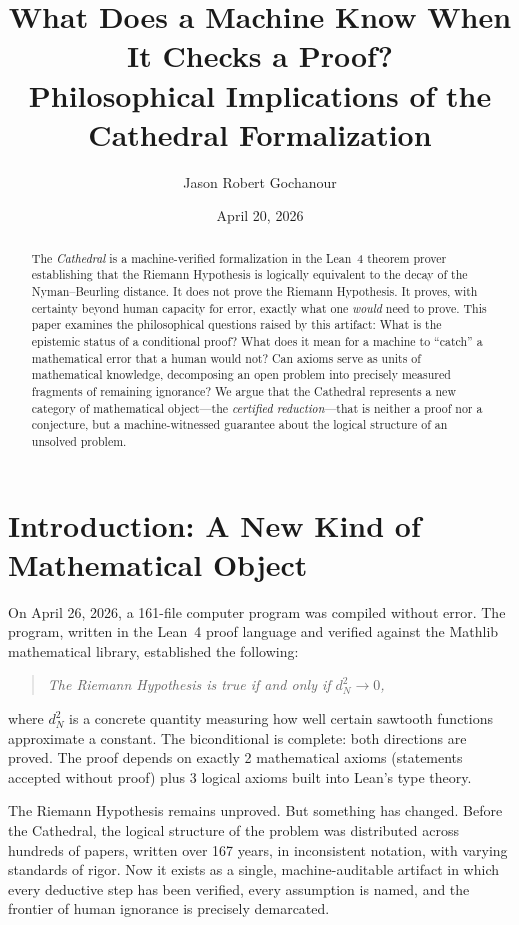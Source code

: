 \documentclass[11pt,a4paper]{article}
\title{%
  What Does a Machine Know When It Checks a Proof?\\[0.3cm]
  {\large Philosophical Implications of the Cathedral Formalization}%
}
\author{
  Jason Robert Gochanour
}
\date{April 20, 2026}
\begin{document}
\maketitle

\begin{abstract}
The \emph{Cathedral} is a machine-verified formalization in the Lean~4
theorem prover establishing that the Riemann Hypothesis is logically
equivalent to the decay of the Nyman--Beurling distance. It does not
prove the Riemann Hypothesis. It proves, with certainty beyond human
capacity for error, exactly what one \emph{would} need to prove.
This paper examines the philosophical questions raised by this
artifact: What is the epistemic status of a conditional proof? What
does it mean for a machine to ``catch'' a mathematical error that a
human would not? Can axioms serve as units of mathematical knowledge,
decomposing an open problem into precisely measured fragments of
remaining ignorance? We argue that the Cathedral represents a new
category of mathematical object---the \emph{certified reduction}---that
is neither a proof nor a conjecture, but a machine-witnessed
guarantee about the logical structure of an unsolved problem.
\end{abstract}

\tableofcontents

\section{Introduction: A New Kind of Mathematical Object}

On April 26, 2026, a 161-file computer program was compiled without
error. The program, written in the Lean~4 proof language and verified
against the Mathlib mathematical library, established the following:

\begin{quote}
\emph{The Riemann Hypothesis is true if and only if $d_N^2 \to 0$,}
\end{quote}

\noindent where $d_N^2$ is a concrete quantity measuring how well
certain sawtooth functions approximate a constant. The biconditional
is complete: both directions are proved. The proof depends on exactly
2 mathematical axioms (statements accepted without proof) plus 3
logical axioms built into Lean's type theory.

The Riemann Hypothesis remains unproved. But something has changed.
Before the Cathedral, the logical structure of the problem was
distributed across hundreds of papers, written over 167 years, in
inconsistent notation, with varying standards of rigor. Now it exists
as a single, machine-auditable artifact in which every deductive
step has been verified, every assumption is named, and the frontier
of human ignorance is precisely demarcated.
\end{document}
